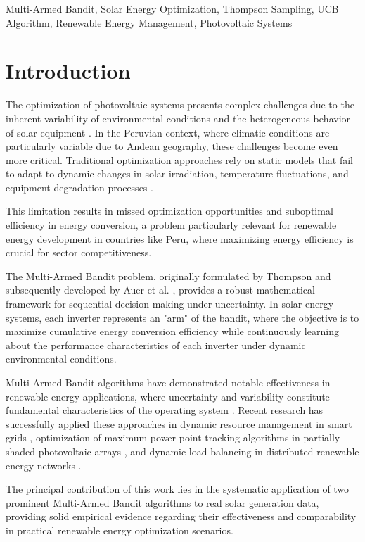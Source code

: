 \documentclass[conference]{IEEEtran}
\begin{document}
\begin{IEEEkeywords}
Multi-Armed Bandit, Solar Energy Optimization, Thompson Sampling, UCB Algorithm, Renewable Energy Management, Photovoltaic Systems
\end{IEEEkeywords}

\section{Introduction}

The optimization of photovoltaic systems presents complex challenges due to the inherent variability of environmental conditions and the heterogeneous behavior of solar equipment \cite{mahmoud2021}. In the Peruvian context, where climatic conditions are particularly variable due to Andean geography, these challenges become even more critical. Traditional optimization approaches rely on static models that fail to adapt to dynamic changes in solar irradiation, temperature fluctuations, and equipment degradation processes \cite{rezk2020}.

This limitation results in missed optimization opportunities and suboptimal efficiency in energy conversion, a problem particularly relevant for renewable energy development in countries like Peru, where maximizing energy efficiency is crucial for sector competitiveness.

The Multi-Armed Bandit problem, originally formulated by Thompson \cite{thompson1933} and subsequently developed by Auer et al. \cite{auer2002}, provides a robust mathematical framework for sequential decision-making under uncertainty. In solar energy systems, each inverter represents an "arm" of the bandit, where the objective is to maximize cumulative energy conversion efficiency while continuously learning about the performance characteristics of each inverter under dynamic environmental conditions.

Multi-Armed Bandit algorithms have demonstrated notable effectiveness in renewable energy applications, where uncertainty and variability constitute fundamental characteristics of the operating system \cite{li2021}. Recent research has successfully applied these approaches in dynamic resource management in smart grids \cite{kumar2021}, optimization of maximum power point tracking algorithms in partially shaded photovoltaic arrays \cite{batarseh2020}, and dynamic load balancing in distributed renewable energy networks \cite{wang2022}.

The principal contribution of this work lies in the systematic application of two prominent Multi-Armed Bandit algorithms to real solar generation data, providing solid empirical evidence regarding their effectiveness and comparability in practical renewable energy optimization scenarios.
\end{document}
